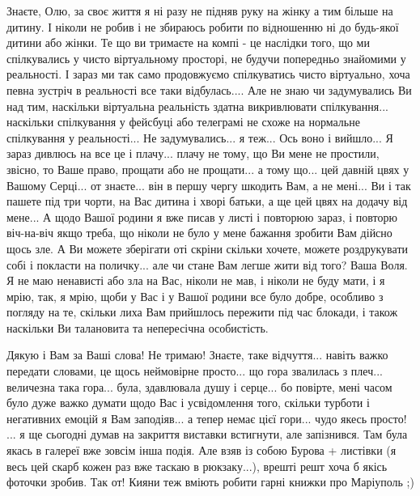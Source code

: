Знаєте, Олю, за своє життя я ні разу не підняв руку на жінку а тим більше на
дитину. І ніколи не робив і не збираюсь робити по відношенню ні до будь-якої
дитини або жінки. Те що ви тримаєте на компі - це наслідки того, що ми
спілкувались у чисто віртуальному просторі, не будучи попередньо знайомими у
реальності. І зараз ми так само продовжуємо спілкуватись чисто віртуально, хоча
певна зустріч в реальності все таки відбулась.... Але не знаю чи задумувались
Ви над тим, наскільки віртуальна реальність здатна викривлювати спілкування...
наскільки спілкування у фейсбуці або телеграмі не схоже на нормальне
спілкування у реальності... Не задумувались... я теж... Ось воно і вийшло... Я
зараз дивлюсь на все це і плачу... плачу не тому, що Ви мене не простили,
звісно, то Ваше право, прощати або не прощати... а тому що... цей давній цвях у
Вашому Серці... от знаєте... він в першу чергу шкодить Вам, а не мені...  Ви і
так пашете під три чорти, на Вас дитина і хворі батьки, а ще цей цвях на додачу
від мене...  А щодо Вашої родини я вже писав у листі і повторюю зараз, і
повторю віч-на-віч якщо треба, що ніколи не було у мене бажання зробити Вам
дійсно щось зле.  А Ви можете зберігати оті скріни скільки хочете, можете
роздрукувати собі і покласти на поличку... але чи стане Вам легше жити від
того? Ваша Воля. Я не маю ненависті або зла на Вас, ніколи не мав, і ніколи не
буду мати, і я мрію, так, я мрію, щоби у Вас і у Вашої родини все було добре,
особливо з погляду на те, скільки лиха Вам прийшлось пережити під час блокади,
і також наскільки Ви талановита та непересічна особистість.

Дякую і Вам за Ваші слова! Не тримаю! Знаєте, таке відчуття... навіть важко
передати словами, це щось неймовірне просто... що гора звалилась з плеч...
величезна така гора... була, здавлювала душу і серце... бо повірте, мені часом
було дуже важко думати щодо Вас і усвідомлення того, скільки турботи і негативних емоцій я Вам заподіяв...
а тепер немає цієї гори... чудо якесь просто!  ... я ще сьогодні думав на закриття
виставки встигнути, але запізнився. Там була якась в галереї вже зовсім інша подія. 
Але взяв із собою Бурова + листівки (я весь цей скарб кожен раз вже таскаю в рюкзаку...), врешті решт хоча б якісь фоточки зробив. 
Так от! Кияни теж вміють робити гарні книжки про Маріуполь ;)

